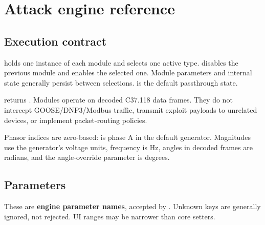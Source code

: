 \chapter{Attack engine reference}\label{chapter-6}
\section*{Execution contract}
 holds one instance of each module and selects one active type.  disables the previous module and enables the selected one. Module parameters and internal state generally persist between selections.  is the default passthrough state.

 returns . Modules operate on decoded C37.118 data frames. They do not intercept GOOSE/DNP3/Modbus traffic, transmit exploit payloads to unrelated devices, or implement packet-routing policies.

Phasor indices are zero-based:  is phase A in the default generator. Magnitudes use the generator's voltage units, frequency is Hz, angles in decoded frames are radians, and the angle-override parameter is degrees.

\section*{Parameters}
These are \textbf{engine parameter names}, accepted by . Unknown keys are generally ignored, not rejected. UI ranges may be narrower than core setters.

